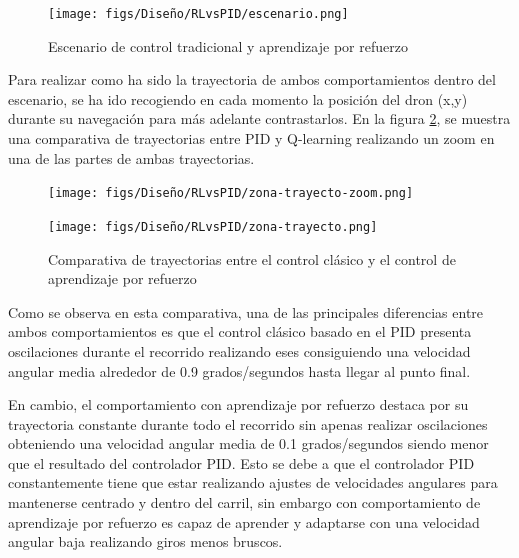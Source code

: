 \begin{figure} [H]
  \begin{center}
    \texttt{[image: figs/Diseño/RLvsPID/escenario.png]}
  \end{center}
  \caption{Escenario de control tradicional y aprendizaje por refuerzo}
  \label{fig:escenario-comparativa}
\end{figure}

Para realizar como ha sido la trayectoria de ambos comportamientos dentro del escenario, se ha ido recogiendo en cada momento la posición del dron (x,y) durante su navegación
 para más adelante contrastarlos. En la figura \ref{fig:Comparativa-de-trayectorias}, se muestra una comparativa de trayectorias entre PID y Q-learning 
realizando un zoom en una de las partes de ambas 
trayectorias.

\begin{figure}[H]
  \centering
  \begin{minipage}{0.65\textwidth}
    \texttt{[image: figs/Diseño/RLvsPID/zona-trayecto-zoom.png]}
  \end{minipage}

  \vspace{1cm}

  \begin{minipage}{0.65\textwidth}
    \texttt{[image: figs/Diseño/RLvsPID/zona-trayecto.png]}
  \end{minipage}
  \caption{Comparativa de trayectorias entre el control clásico y el control de aprendizaje por refuerzo}
  \label{fig:Comparativa-de-trayectorias}
\end{figure}

Como se observa en esta comparativa, una de las principales diferencias entre ambos comportamientos es que el control clásico basado en el PID presenta oscilaciones durante el recorrido 
realizando eses consiguiendo una velocidad angular media alrededor de 0.9 grados/segundos hasta llegar al punto final.  

En cambio, el comportamiento con aprendizaje por refuerzo destaca por su trayectoria constante durante todo el recorrido sin apenas realizar oscilaciones obteniendo una velocidad angular 
media de 0.1 grados/segundos siendo menor que el resultado del controlador PID. Esto se debe a que el controlador PID constantemente tiene que estar realizando ajustes de velocidades 
angulares para mantenerse centrado y dentro del carril, sin embargo con comportamiento de aprendizaje por refuerzo es capaz de aprender y adaptarse con una velocidad angular baja 
realizando giros menos bruscos. 

